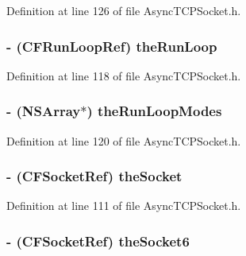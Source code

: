 Definition at line 126 of file AsyncTCPSocket.h.

\hypertarget{interface_async_t_c_p_socket_a0df4eb574cfbcba161dc7589f8e9913e}{
\subsubsection[{theRunLoop}]{\setlength{\rightskip}{0pt plus 5cm}-\/ (CFRunLoopRef) {\bf theRunLoop}}}
\label{interface_async_t_c_p_socket_a0df4eb574cfbcba161dc7589f8e9913e}


Definition at line 118 of file AsyncTCPSocket.h.

\hypertarget{interface_async_t_c_p_socket_a12b4b7a67bd7a3c4a03a95117020aee4}{
\subsubsection[{theRunLoopModes}]{\setlength{\rightskip}{0pt plus 5cm}-\/ (NSArray$\ast$) {\bf theRunLoopModes}}}
\label{interface_async_t_c_p_socket_a12b4b7a67bd7a3c4a03a95117020aee4}


Definition at line 120 of file AsyncTCPSocket.h.

\hypertarget{interface_async_t_c_p_socket_afd7bd1b4130d08f2fbe8621b08eb69ab}{
\subsubsection[{theSocket}]{\setlength{\rightskip}{0pt plus 5cm}-\/ (CFSocketRef) {\bf theSocket}}}
\label{interface_async_t_c_p_socket_afd7bd1b4130d08f2fbe8621b08eb69ab}


Definition at line 111 of file AsyncTCPSocket.h.

\hypertarget{interface_async_t_c_p_socket_a94c7d0086b3d4a9495e0ef87bca42a22}{
\subsubsection[{theSocket6}]{\setlength{\rightskip}{0pt plus 5cm}-\/ (CFSocketRef) {\bf theSocket6}}}
\label{interface_async_t_c_p_socket_a94c7d0086b3d4a9495e0ef87bca42a22}


